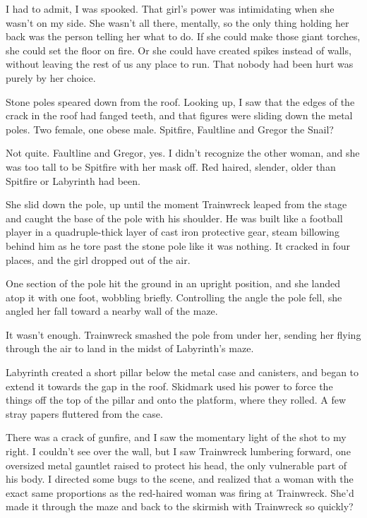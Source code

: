 I had to admit, I was spooked.  That girl's power was intimidating when she wasn't on my side.  She wasn't all there, mentally, so the only thing holding her back was the person telling her what to do.  If she could make those giant torches, she could set the floor on fire.  Or she could have created spikes instead of walls, without leaving the rest of us any place to run.  That nobody had been hurt was purely by her choice.



Stone poles speared down from the roof.  Looking up, I saw that the edges of the crack in the roof had fanged teeth, and that figures were sliding down the metal poles.  Two female, one obese male.  Spitfire, Faultline and Gregor the Snail?



Not quite.  Faultline and Gregor, yes.  I didn't recognize the other woman, and she was too tall to be Spitfire with her mask off.  Red haired, slender, older than Spitfire or Labyrinth had been.



She slid down the pole, up until the moment Trainwreck leaped from the stage and caught the base of the pole with his shoulder.  He was built like a football player in a quadruple-thick layer of cast iron protective gear, steam billowing behind him as he tore past the stone pole like it was nothing.  It cracked in four places, and the girl dropped out of the air.



One section of the pole hit the ground in an upright position, and she landed atop it with one foot, wobbling briefly.  Controlling the angle the pole fell, she angled her fall toward a nearby wall of the maze.



It wasn't enough.  Trainwreck smashed the pole from under her, sending her flying through the air to land in the midst of Labyrinth's maze.



Labyrinth created a short pillar below the metal case and canisters, and began to extend it towards the gap in the roof.  Skidmark used his power to force the things off the top of the pillar and onto the platform, where they rolled.  A few stray papers fluttered from the case.



There was a crack of gunfire, and I saw the momentary light of the shot to my right.  I couldn't see over the wall, but I saw Trainwreck lumbering forward, one oversized metal gauntlet raised to protect his head, the only vulnerable part of his body.  I directed some bugs to the scene, and realized that a woman with the exact same proportions as the red-haired woman was firing at Trainwreck.  She'd made it through the maze and back to the skirmish with Trainwreck so quickly?




